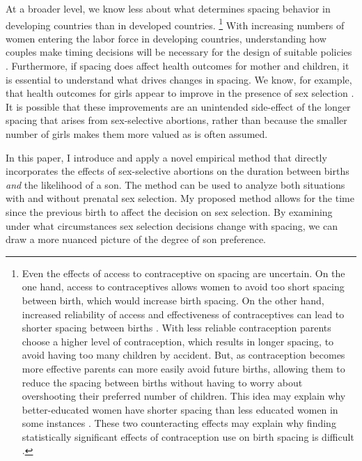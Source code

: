 \documentclass[12pt,letterpaper]{article}
\begin{document}
At a broader level, we know less about what determines spacing behavior in 
developing countries than in developed countries.%
\footnote{
Even the effects of access to contraceptive on spacing are uncertain.
On the one hand, access to contraceptives allows women to avoid too 
short spacing between birth, which would increase birth spacing.
On the other hand, increased reliability of access and effectiveness of
contraceptives can lead to shorter spacing between births 
\citep{Keyfitz1971,Heckman1976}.
With less reliable contraception parents choose a higher level 
of contraception, which results in longer spacing, to avoid having 
too many children by accident.
But, as contraception becomes more effective parents can more
easily avoid future births, allowing them to reduce the spacing 
between births without having to worry about overshooting their 
preferred number of children.
This idea may explain why better-educated women have
shorter spacing than less educated women in some instances
 \citep{Tulasidhar1993,Whitworth2002}.
These two counteracting effects may explain why finding statistically 
significant effects of contraception use on birth spacing is 
difficult \citep{Yeakey2009}.
}
With increasing numbers of women entering the labor force in developing
countries, understanding how couples make timing decisions will be necessary
for the design of suitable policies \citep{Portner2018}.
Furthermore, if spacing does affect health outcomes for mother and children, it is 
essential to understand what drives changes in spacing.
We know, for example, that health outcomes for girls appear to improve
in the presence of sex selection \citep{Lin2014,Hu2015}.
It is possible that these improvements are an unintended side-effect of
the longer spacing that arises from sex-selective abortions, rather than
because the smaller number of girls makes them more valued as is often
assumed.


In this paper, I introduce and apply a novel empirical method that directly incorporates 
the effects of sex-selective abortions on 
the duration between births
\emph{and} 
the likelihood of a son. 
The method can be used to analyze both situations with and without prenatal
sex selection.
My proposed method allows for the time since the previous 
birth to affect the decision on sex selection.
By examining under what circumstances sex selection decisions change with 
spacing, we can draw a more nuanced picture of the degree of son preference.
\end{document}
